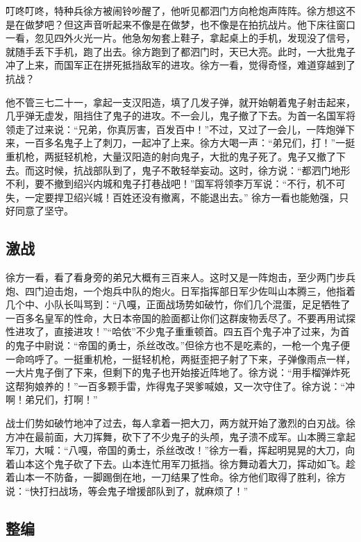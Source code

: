 \documentclass[UTF8,a4paper,titlepage,twoside,10.5pt]{article}
\begin{document}
叮咚叮咚，特种兵徐方被闹铃吵醒了，他听见都泗门方向枪炮声阵阵。徐方想这不是在做梦吧？但这声音听起来不像是在做梦，也不像是在拍抗战片。他下床往窗口一看，忽见四外火光一片。他急匆匆套上鞋子，拿起桌上的手机，发现没了信号，就随手丢下手机，跑了出去。徐方跑到了都泗门时，天已大亮。此时，一大批鬼子冲了上来，而国军正在拼死抵挡敌军的进攻。徐方一看，觉得奇怪，难道穿越到了抗战？

他不管三七二十一，拿起一支汉阳造，填了几发子弹，就开始朝着鬼子射击起来，几乎弹无虚发，阻挡住了鬼子的进攻。不一会儿，鬼子撤了下去。为首一名国军将领走了过来说：“兄弟，你真厉害，百发百中！”不过，又过了一会儿，一阵炮弹下来，一百多名鬼子上了刺刀，一起冲了上来。徐方大喝一声：“弟兄们，打！”一挺重机枪，两挺轻机枪，大量汉阳造的射向鬼子，大批的鬼子死了。鬼子又撤了下去。而这时候，抗战部队到了，鬼子不敢轻举妄动。这时，徐方说：“都泗门地形不利，要不撤到绍兴内城和鬼子打巷战吧！”国军将领李万军说：“不行，机不可失，一定要捍卫绍兴城！百姓还没有撤离，不能退出去。” 徐方一看也能勉强，只好同意了坚守。

\subsection{激战}
\label{sec:orgc3317e8}

徐方一看，看了看身旁的弟兄大概有三百来人。这时又是一阵炮击，至少两门步兵炮、四门迫击炮，一个炮兵中队的炮火。日军指挥部日军少佐叫山本腾三，他指着几个中、小队长叫骂到：“八嘎，正面战场势如破竹，你们几个混蛋，足足牺牲了一百多名皇军的性命，大日本帝国的脸面都让你们这群废物丢尽了。不要再用试探性进攻了，直接进攻！”“哈依”不少鬼子重重顿首。四五百个鬼子冲了过来，为首的鬼子中尉说：“帝国的勇士，杀丝改改。”但徐方也不是吃素的，一枪一个鬼子便一命呜呼了。一挺重机枪，一挺轻机枪，两挺歪把子射了下来，子弹像雨点一样，一大片鬼子倒了下来，但剩下的鬼子也开始接近阵地了。徐方说：“用手榴弹炸死这帮狗娘养的！”一百多颗手雷，炸得鬼子哭爹喊娘，又一次守住了。徐方说：“冲啊！弟兄们，打啊！”

战士们势如破竹地冲了过去，每人拿着一把大刀，两方就开始了激烈的白刃战。徐方冲在最前面，大刀挥舞，砍下了不少鬼子的头颅，鬼子溃不成军。山本腾三拿起军刀，大喊：“八嘎，帝国的勇士，杀丝改改！”徐方一看，挥起明晃晃的大刀，向着山本这个鬼子砍了下去。山本连忙用军刀抵挡。徐方舞动着大刀，挥动如飞。趁着山本一不防备，一脚踢倒在地，一刀结果了性命。徐方他们取得了胜利，徐方说：“快打扫战场，等会鬼子增援部队到了，就麻烦了！”

\subsection{整编}
\label{sec:orgf15e206}
\end{document}
